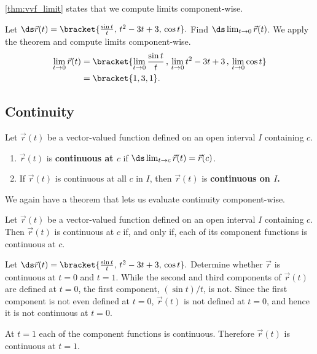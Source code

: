 \autoref{thm:vvf_limit} states that we compute limits component-wise.

\begin{example}\label{ex_vvflimit1}%
Let $\ds\vec r(t) =\bracket{\frac{\sin t}{t},\, t^2-3t+3,\,\cos t}.$ Find $\ds \lim_{t\to 0}\vec r(t)$.
\solution
We apply the theorem and compute limits component-wise.
\begin{align*}
\lim_{t\to0} \vec r(t) &=\bracket{\lim_{t\to 0}\frac{\sin t}{t}\, , \, \lim_{t\to 0} t^2-3t+3\, , \, \lim_{t\to 0} \cos t}\\
			&=\bracket{1,3,1}.
\end{align*}
\end{example}

\subsection{Continuity}

\begin{definition}\label{def:vvf_continuity}%
Let $\vec r(t)$ be a vector-valued function defined on an open interval $I$ containing $c$.
\begin{enumerate}
	\item $\vec r(t)$ is \textbf{continuous at $c$} if $\ds \lim_{t\to c} \vec r(t) = \vec r(c)$.
	\item	If $\vec r(t)$ is continuous at all $c$ in $I$, then $\vec r(t)$ is \textbf{continuous on $I$.}
\end{enumerate}
\end{definition}

We again have a theorem that lets us evaluate continuity component-wise.

\begin{theorem}\label{thm:vvf_continuity}%
Let $\vec r(t)$ be a vector-valued function defined on an open interval $I$ containing $c$. Then $\vec r(t)$ is continuous at $c$ if, and only if, each of its component functions is continuous at $c$.
\end{theorem}

\begin{example}\label{ex_vvflimit2}%
Let $\ds\vec r(t) =\bracket{\frac{\sin t}{t},\, t^2-3t+3,\,\cos t}.$ Determine whether $\vec r$ is continuous at $t=0$ and $t=1$.
\solution
While the second and third components of $\vec r(t)$ are defined at $t=0$, the first component, $(\sin t)/t$, is not. Since the first component is not even defined at $t=0$, $\vec r(t)$ is not defined at $t=0$, and hence it is not continuous at $t=0$.

At $t=1$ each of the component functions is continuous. Therefore $\vec r(t)$ is continuous at $t=1$.
\end{example}

